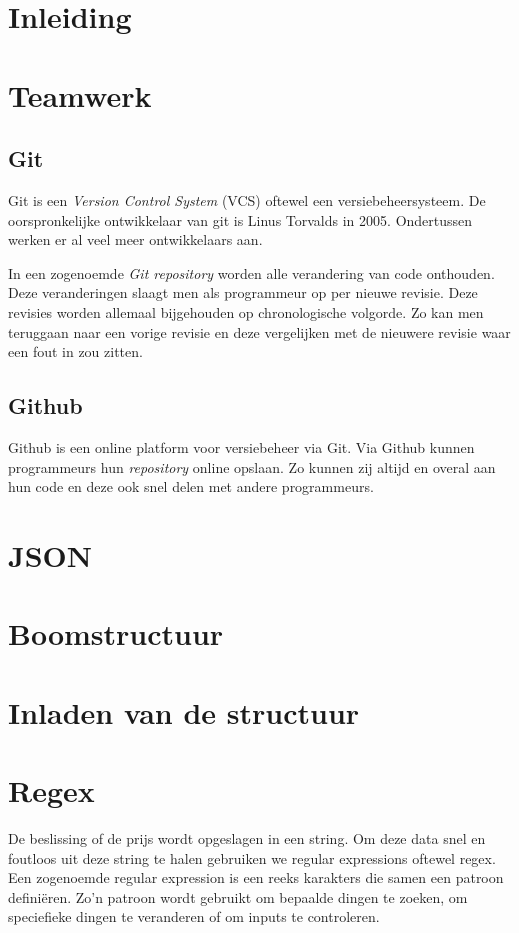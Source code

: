 \section{Inleiding}

\section{Teamwerk}
\subsection{Git}
Git is een \textit{Version Control System} (VCS) oftewel een versiebeheersysteem. De oorspronkelijke ontwikkelaar van git is Linus Torvalds in 2005.\cite{init_git} Ondertussen werken er al veel meer ontwikkelaars aan.

In een zogenoemde \textit{Git repository} worden alle verandering van code onthouden. Deze veranderingen slaagt men als programmeur op per nieuwe revisie. Deze revisies worden allemaal bijgehouden op chronologische volgorde. Zo kan men teruggaan naar een vorige revisie en deze vergelijken met de nieuwere revisie waar een fout in zou zitten.
\subsection{Github}
Github is een online platform voor versiebeheer via Git. Via Github kunnen programmeurs hun \textit{repository} online opslaan. Zo kunnen zij altijd en overal aan hun code en deze ook snel delen met andere programmeurs.

\section{JSON}



\section{Boomstructuur}

\section{Inladen van de structuur}

\section{Regex}
De beslissing of de prijs wordt opgeslagen in een string. Om deze data snel en foutloos uit deze string te halen gebruiken we regular expressions oftewel regex. Een zogenoemde regular expression is een reeks karakters die samen een patroon definiëren. Zo'n patroon wordt gebruikt om bepaalde dingen te zoeken, om speciefieke dingen te veranderen of om inputs te controleren.\cite{wiki:regex}

